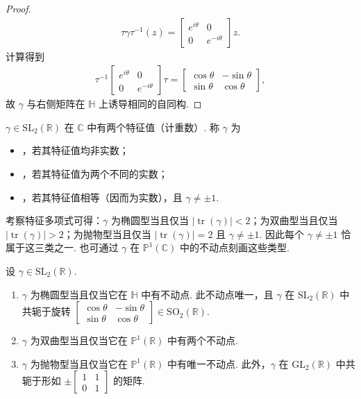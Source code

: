 \begin{proof}
\begin{align*}
\tau\gamma\tau^{-1}(z)=\begin{bmatrix}e^{i\theta}&0\\0&e^{-i\theta}\end{bmatrix}z.
\end{align*}
计算得到
\begin{align*}
\tau^{-1}\begin{bmatrix}e^{i\theta}&0\\0&e^{-i\theta}\end{bmatrix}\tau=\begin{bmatrix}\cos\theta&-\sin\theta\\\sin\theta&\cos\theta\end{bmatrix},
\end{align*}
故 $\gamma$ 与右侧矩阵在 $\mathbb H$ 上诱导相同的自同构.
\end{proof}
$\gamma\in\mathrm{SL}_2(\mathbb R)$ 在 $\mathbb C$ 中有两个特征值（计重数）. 称 $\gamma$ 为
\begin{itemize}
\item {}，若其特征值均非实数；
\item {}，若其特征值为两个不同的实数；
\item {}，若其特征值相等（因而为实数），且 $\gamma\ne\pm1$.
\end{itemize}
考察特征多项式可得：$\gamma$ 为椭圆型当且仅当 $|\operatorname{tr}(\gamma)|<2$；为双曲型当且仅当 $|\operatorname{tr}(\gamma)|>2$；为抛物型当且仅当 $|\operatorname{tr}(\gamma)|=2$ 且 $\gamma\ne\pm1$. 因此每个 $\gamma\ne\pm1$ 恰属于这三类之一. 也可通过 $\gamma$ 在 $\mathbb P^1(\mathbb C)$ 中的不动点刻画这些类型.
\begin{lemma*}
设 $\gamma\in\mathrm{SL}_2(\mathbb R)$.
\begin{enumerate}[label=\roman*)]
\item $\gamma$ 为椭圆型当且仅当它在 $\mathbb H$ 中有不动点. 此不动点唯一，且 $\gamma$ 在 $\mathrm{SL}_2(\mathbb R)$ 中共轭于旋转 $\left[\begin{smallmatrix}\cos\theta&-\sin\theta\\\sin\theta&\cos\theta\end{smallmatrix}\right]\in\mathrm{SO}_2(\mathbb R)$.
\item $\gamma$ 为双曲型当且仅当它在 $\mathbb P^1(\mathbb R)$ 中有两个不动点.
\item $\gamma$ 为抛物型当且仅当它在 $\mathbb P^1(\mathbb R)$ 中有唯一不动点. 此外，$\gamma$ 在 $\mathrm{GL}_2(\mathbb R)$ 中共轭于形如 $\pm\left[\begin{smallmatrix}1&1\\0&1\end{smallmatrix}\right]$ 的矩阵.
\end{enumerate}
\end{lemma*}
